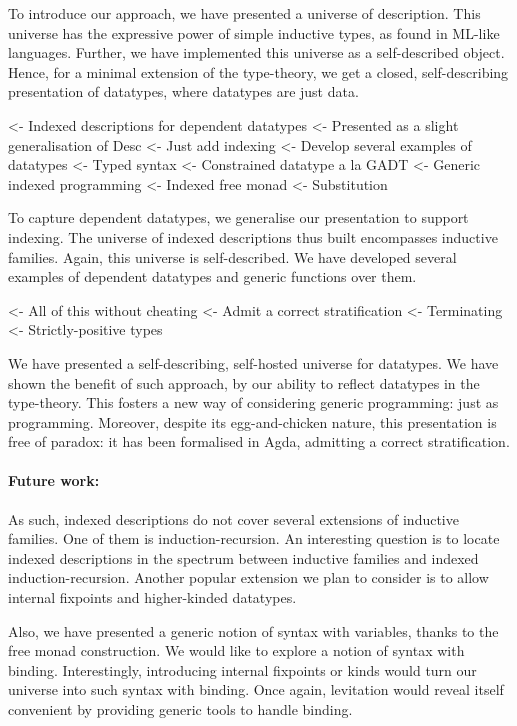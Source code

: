\documentclass[authoryear]{sigplanconf}
\newenvironment{wstructure}{\comment}{\endcomment}
\begin{document}
To introduce our approach, we have presented a universe of
description. This universe has the expressive power of simple
inductive types, as found in ML-like languages. Further, we have
implemented this universe as a self-described object. Hence, for a
minimal extension of the type-theory, we get a closed, self-describing
presentation of datatypes, where datatypes are just data.

\begin{wstructure}
<- Indexed descriptions for dependent datatypes
    <- Presented as a slight generalisation of Desc
        <- Just add indexing
    <- Develop several examples of datatypes
        <- Typed syntax
        <- Constrained datatype a la GADT
    <- Generic indexed programming
        <- Indexed free monad
        <- Substitution
\end{wstructure}

To capture dependent datatypes, we generalise our presentation to
support indexing. The universe of indexed descriptions thus built
encompasses inductive families. Again, this universe is
self-described. We have developed several examples of dependent
datatypes and generic functions over them.

\begin{wstructure}
<- All of this without cheating
    <- Admit a correct stratification
    <- Terminating
    <- Strictly-positive types
\end{wstructure}

We have presented a self-describing, self-hosted universe for
datatypes. We have shown the benefit of such approach, by our ability
to reflect datatypes in the type-theory. This fosters a new way of
considering generic programming: just as programming. Moreover,
despite its egg-and-chicken nature, this presentation is free of
paradox: it has been formalised in Agda, admitting a correct
stratification.

\paragraph{Future work:} As such, indexed descriptions do
not cover several extensions of inductive families. One of them is
induction-recursion. An interesting question is to locate indexed
descriptions in the spectrum between inductive families and indexed
induction-recursion. Another popular extension we plan to consider is
to allow internal fixpoints and higher-kinded datatypes.

Also, we have presented a generic notion of syntax with variables,
thanks to the free monad construction. We would like to explore a
notion of syntax with binding. Interestingly, introducing internal
fixpoints or kinds would turn our universe into such syntax with
binding. Once again, levitation would reveal itself convenient by
providing generic tools to handle binding.
\end{document}
